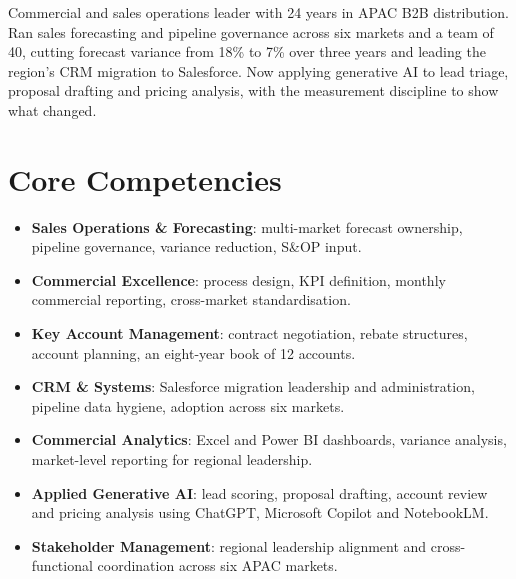 \documentclass[11pt,a4paper,sans]{moderncv}
\begin{document}
\makecvtitle


\vspace{6pt}
\small{Commercial and sales operations leader with 24 years in APAC B2B distribution. Ran sales forecasting and pipeline governance across six markets and a team of 40, cutting forecast variance from 18\% to 7\% over three years and leading the region's CRM migration to Salesforce. Now applying generative AI to lead triage, proposal drafting and pricing analysis, with the measurement discipline to show what changed.}


\section{Core Competencies}
\vspace{1pt}
\begin{itemize}

\item \textbf{Sales Operations \& Forecasting}: multi-market forecast ownership, pipeline governance, variance reduction, S\&OP input.

\item \textbf{Commercial Excellence}: process design, KPI definition, monthly commercial reporting, cross-market standardisation.

\item \textbf{Key Account Management}: contract negotiation, rebate structures, account planning, an eight-year book of 12 accounts.

\item \textbf{CRM \& Systems}: Salesforce migration leadership and administration, pipeline data hygiene, adoption across six markets.

\item \textbf{Commercial Analytics}: Excel and Power BI dashboards, variance analysis, market-level reporting for regional leadership.

\item \textbf{Applied Generative AI}: lead scoring, proposal drafting, account review and pricing analysis using ChatGPT, Microsoft Copilot and NotebookLM.

\item \textbf{Stakeholder Management}: regional leadership alignment and cross-functional coordination across six APAC markets.

\end{itemize}
\end{document}
